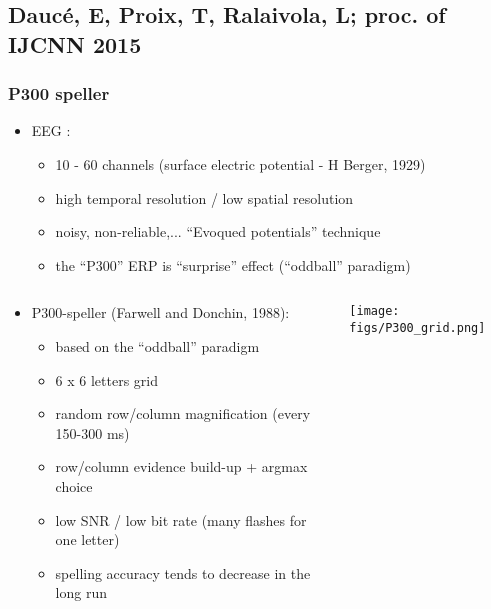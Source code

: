 \documentclass{beamer}
\begin{document}
\subsection{Daucé, E, Proix, T, Ralaivola, L; proc. of IJCNN 2015}
\begin{frame}
	\tableofcontents[currentsubsection]
\end{frame} 

\begin{frame} \frametitle{P300 speller}
	\vspace{-.3cm}
\footnotesize
	\begin{itemize}
		\item EEG : 
		\vspace{-.1cm}		
		\begin{itemize}
			\item 10 - 60 channels (surface electric potential - H Berger, 1929)
			\item high temporal resolution / low spatial resolution
			\item noisy, non-reliable,... ``Evoqued potentials'' technique
			\item the ``P300'' ERP is ``surprise'' effect (``oddball'' paradigm)
		\end{itemize}
	\end{itemize}
	\vspace{-.3cm}
	\begin{columns}
		\begin{column}{0.75\linewidth}
			\begin{itemize}
				\item P300-speller (Farwell and Donchin, 1988):
				\begin{itemize}
					\item based on the ``oddball'' paradigm
					\item 6 x 6 letters grid
					\item random row/column magnification (every 150-300 ms)
					\item row/column evidence build-up + argmax choice
					\item low SNR / low bit rate (many flashes for one letter)
					\item spelling accuracy tends to decrease in the long run
				\end{itemize}
			\end{itemize}
		\end{column}
		\begin{column}{0.25\linewidth}
			\centerline{
				\texttt{[image: figs/P300\_grid.png]}
			}
		\end{column}
	\end{columns}
\normalsize
\end{frame}
\end{document}
